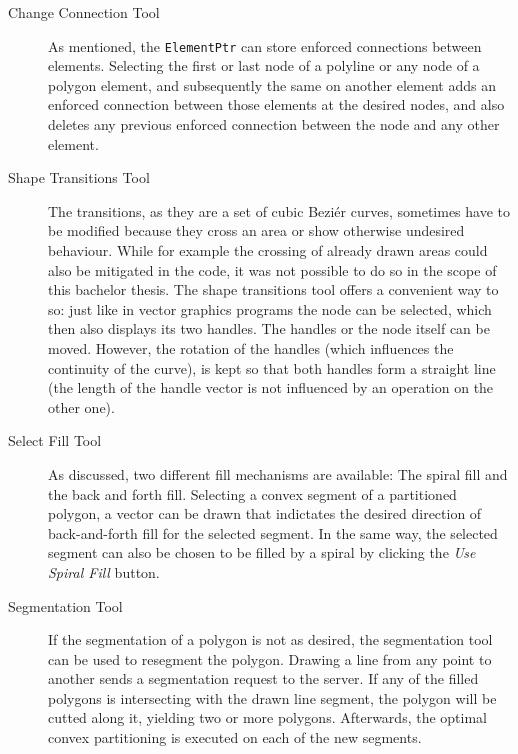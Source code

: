 \begin{description}
\item[Change Connection Tool] As mentioned, the \texttt{ElementPtr} can store enforced connections between elements. Selecting the first or last node of a polyline or any node of a polygon element, and subsequently the same on another element adds an enforced connection between those elements at the desired nodes, and also deletes any previous enforced connection between the node and any other element.
\item[Shape Transitions Tool] The transitions, as they are a set of cubic Beziér curves, sometimes have to be modified because they cross an area or show otherwise undesired behaviour. While for example the crossing of already drawn areas could also be mitigated in the code, it was not possible to do so in the scope of this bachelor thesis. The shape transitions tool offers a convenient way to so: just like in vector graphics programs the node can be selected, which then also displays its two handles. The handles or the node itself can be moved. However, the rotation of the handles (which influences the continuity of the curve), is kept so that both handles form a straight line (the length of the handle vector is not influenced by an operation on the other one).
\item[Select Fill Tool] As discussed, two different fill mechanisms are available: The spiral fill and the back and forth fill. Selecting a convex segment of a partitioned polygon, a vector can be drawn that indictates the desired direction of back-and-forth fill for the selected segment. In the same way, the selected segment can also be chosen to be filled by a spiral by clicking the \textit{Use Spiral Fill} button.
\item[Segmentation Tool] If the segmentation of a polygon is not as desired, the segmentation tool can be used to resegment the polygon. Drawing a line from any point to another sends a segmentation request to the server. If any of the filled polygons is intersecting with the drawn line segment, the polygon will be cutted along it, yielding two or more polygons. Afterwards, the optimal convex partitioning is executed on each of the new segments.
\end{description} 
